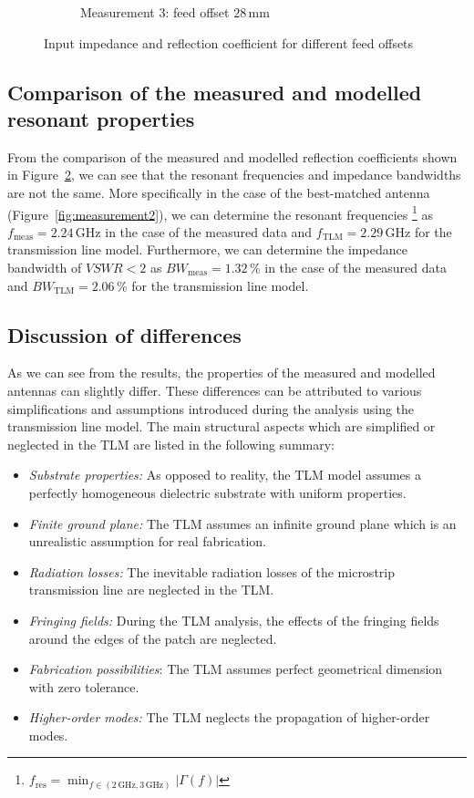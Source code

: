 \documentclass[11pt,a4paper]{article}
\begin{document}
\begin{figure}[!ht]
\begin{subfigure}{.8\textwidth}
                    \caption{\label{fig:measurement3}Measurement 3: feed offset $28\, \mathrm{mm}$}
                \end{subfigure}
                \caption{\label{fig:measurements}Input impedance and reflection coefficient for different feed offsets}
            \end{figure}

        \subsection{Comparison of the measured and modelled resonant properties}
            From the comparison of the measured and modelled reflection coefficients shown in Figure~\ref{fig:measurements}, we can see that the resonant frequencies and impedance bandwidths are not the same. More specifically in the case of the best-matched antenna (Figure~\ref{fig:measurement2}), we can determine the resonant frequencies%
                \footnote{$f_{\mathrm{res}} = \min_{f \in (2\, \mathrm{GHz}, 3\, \mathrm{GHz})}|\Gamma(f)|$}
            as $f_{\mathrm{meas}} = 2.24\, \mathrm{GHz}$ in the case of the measured data and $f_{\mathrm{TLM}} = 2.29\, \mathrm{GHz}$ for the transmission line model. Furthermore, we can determine the impedance bandwidth of $\mathit{VSWR} < 2$ as $\mathit{BW}_{\mathrm{meas}} = 1.32\, \%$ in the case of the measured data and $\mathit{BW}_{\mathrm{TLM}} = 2.06\, \%$ for the transmission line model.

        \subsection{Discussion of differences}
            As we can see from the results, the properties of the measured and modelled antennas can slightly differ. These differences can be attributed to various simplifications and assumptions introduced during the analysis using the transmission line model. The main structural aspects which are simplified or neglected in the TLM are listed in the following summary:
            \begin{itemize}
                \item \emph{Substrate properties:} As opposed to reality, the TLM model assumes a perfectly homogeneous dielectric substrate with uniform properties.
                \item \emph{Finite ground plane:} The TLM assumes an infinite ground plane which is an unrealistic assumption for real fabrication.
                \item \emph{Radiation losses:} The inevitable radiation losses of the microstrip transmission line are neglected in the TLM.
                \item \emph{Fringing fields:} During the TLM analysis, the effects of the fringing fields around the edges of the patch are neglected.
                \item \emph{Fabrication possibilities}: The TLM assumes perfect geometrical dimension with zero tolerance.
                \item \emph{Higher-order modes:} The TLM neglects the propagation of higher-order modes.
            \end{itemize}
\end{document}
